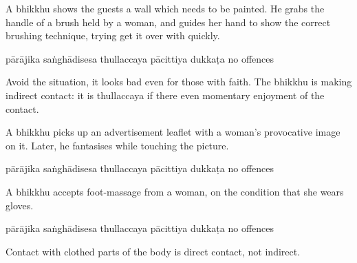 \begin{exam}{\autoExamName}
\begin{problem*}
\begin{parts}
    \bigskip

  \item A bhikkhu shows the guests a wall which needs to be painted. He grabs the
  handle of a brush held by a woman, and guides her hand to show the correct
  brushing technique, trying get it over with quickly.

  \bigskip

  \begin{answers}{6}
    \bChoices
     pārājika\eAns
     saṅghādisesa\eAns
     thullaccaya\eAns
     pācittiya\eAns
     dukkaṭa\eAns
     no offences\eAns
    \eChoices
  \end{answers}

  \begin{solution}
    Avoid the situation, it looks bad even for those with faith. The bhikkhu is
    making indirect contact: it is thullaccaya if there even momentary enjoyment
    of the contact.
  \end{solution}

  \bigskip

  \item A bhikkhu picks up an advertisement leaflet with a woman's provocative
    image on it. Later, he fantasises while touching the picture.

  \bigskip

  \begin{answers}{6}
    \bChoices
     pārājika\eAns
     saṅghādisesa\eAns
     thullaccaya\eAns
     pācittiya\eAns
     dukkaṭa\eAns
     no offences\eAns
    \eChoices
  \end{answers}

  \bigskip

  \item A bhikkhu accepts foot-massage from a woman, on the condition that she wears gloves.

  \bigskip

  \begin{answers}{6}
    \bChoices
     pārājika\eAns
     saṅghādisesa\eAns
     thullaccaya\eAns
     pācittiya\eAns
     dukkaṭa\eAns
     no offences\eAns
    \eChoices
  \end{answers}

  \begin{solution}
    Contact with clothed parts of the body is direct contact, not indirect.
  \end{solution}


\end{parts}
\end{problem*}
\end{exam}
